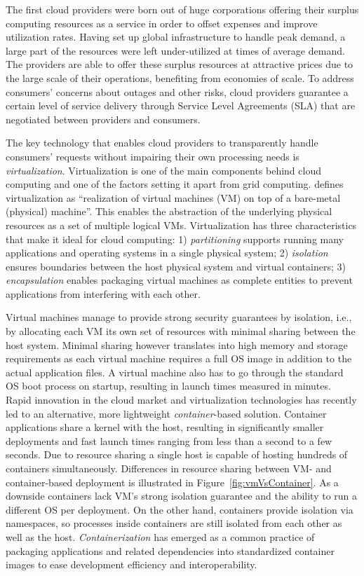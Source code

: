 The first cloud providers were born out of huge corporations offering their surplus computing resources as a service in order to offset expenses and improve utilization rates. Having set up global infrastructure to handle peak demand, a large part of the resources were left under-utilized at times of average demand. The providers are able to offer these surplus resources at attractive prices due to the large scale of their operations, benefiting from economies of scale. To address consumers' concerns about outages and other risks, cloud providers guarantee a certain level of service delivery through Service Level Agreements (SLA) that are negotiated between providers and consumers. \parencite{youseff08cloudOntology}

The key technology that enables cloud providers to transparently handle consumers' requests without impairing their own processing needs is \textit{virtualization}. Virtualization is one of the main components behind cloud computing and one of the factors setting it apart from grid computing. \textcite{tsuruoka16} defines virtualization as ``realization of virtual machines (VM) on top of a bare-metal (physical) machine''. This enables the abstraction of the underlying physical resources as a set of multiple logical VMs. Virtualization has three characteristics that make it ideal for cloud computing: 1) \textit{partitioning} supports running many applications and operating systems in a single physical system; 2) \textit{isolation} ensures boundaries between the host physical system and virtual containers; 3) \textit{encapsulation} enables packaging virtual machines as complete entities to prevent applications from interfering with each other.

Virtual machines manage to provide strong security guarantees by isolation, i.e., by allocating each VM its own set of resources with minimal sharing between the host system. Minimal sharing however translates into high memory and storage requirements as each virtual machine requires a full OS image in addition to the actual application files. A virtual machine also has to go through the standard OS boot process on startup, resulting in launch times measured in minutes. Rapid innovation in the cloud market and virtualization technologies has recently led to an alternative, more lightweight \textit{container}-based solution. Container applications share a kernel with the host, resulting in significantly smaller deployments and fast launch times ranging from less than a second to a few seconds. Due to resource sharing a single host is capable of hosting hundreds of containers simultaneously. Differences in resource sharing between VM- and container-based deployment is illustrated in Figure~\ref{fig:vmVsContainer}. As a downside containers lack VM's strong isolation guarantee and the ability to run a different OS per deployment. On the other hand, containers provide isolation via namespaces, so processes inside containers are still isolated from each other as well as the host. \textit{Containerization} has emerged as a common practice of packaging applications and related dependencies into standardized container images to ease development efficiency and interoperability. \parencite{pahl15containerization}

